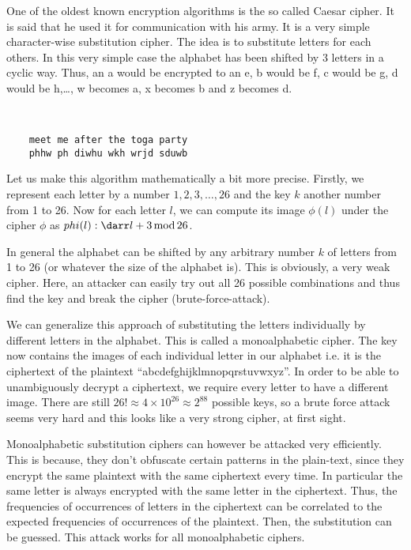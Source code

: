One of the oldest known encryption algorithms is the so called Caesar cipher. It is said that he used it for communication with his army. It is a very simple character-wise substitution cipher. The idea is to substitute letters for each others. In this very simple case the alphabet has been shifted by 3 letters in a cyclic way. Thus, an a would be encrypted to an e, b would be f, c would be g, d would be h,\ldots, w becomes a, x becomes b and z becomes d. 
\begin{example}\ 
  \begin{lstlisting}
  	meet me after the toga party
  	phhw ph diwhu wkh wrjd sduwb
  \end{lstlisting}
\end{example}
Let us make this algorithm mathematically a bit more precise. Firstly, we represent each letter by a number $1, 2, 3,\ldots , 26$ and the key $k$ another number from 1 to 26. Now for each letter $l$, we can compute its image $\phi(l)$ under the cipher $\phi$ as $phi(l):\Equiv l+3\modop 26$.

In general the alphabet can be shifted by any arbitrary number $k$ of letters from 1 to 26 (or whatever the size of the alphabet is). This is obviously, a very weak cipher. Here, an attacker can easily try out all 26 possible combinations and thus find the key and break the cipher (brute-force-attack). 

We can generalize this approach of substituting the letters individually by different letters in the alphabet. This is called a monoalphabetic cipher. The key now contains the images of each individual letter in our alphabet i.e. it is the ciphertext of the plaintext ``abcdefghijklmnopqrstuvwxyz''. In order to be able to unambiguously decrypt a ciphertext, we require every letter to have a different image. There are still $26!\approx 4\times 10^{26}\approx 2^{88}$ possible keys, so a brute force attack seems very hard and this looks like a very strong cipher, at first sight. 

Monoalphabetic substitution ciphers can however be attacked very efficiently. This is because, they don't obfuscate certain patterns in the plain-text, since they encrypt the same plaintext with the same ciphertext every time. In particular the same letter is always encrypted with the same letter in the ciphertext. 
Thus, the frequencies of occurrences of letters in the ciphertext can be correlated to the expected frequencies of occurrences of the plaintext. Then, the substitution can be guessed. This attack works for all monoalphabetic ciphers. 


